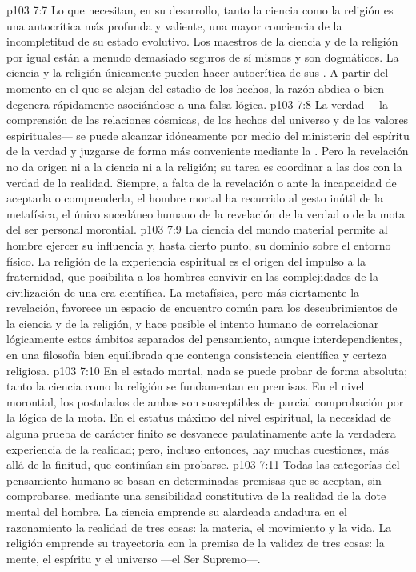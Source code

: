 \vs p103 7:7 Lo que necesitan, en su desarrollo, tanto la ciencia como la religión es una autocrítica más profunda y valiente, una mayor conciencia de la incompletitud de su estado evolutivo. Los maestros de la ciencia y de la religión por igual están a menudo demasiado seguros de sí mismos y son dogmáticos. La ciencia y la religión únicamente pueden hacer autocrítica de sus . A partir del momento en el que se alejan del estadio de los hechos, la razón abdica o bien degenera rápidamente asociándose a una falsa lógica.
\vs p103 7:8 \pc La verdad ---la comprensión de las relaciones cósmicas, de los hechos del universo y de los valores espirituales--- se puede alcanzar idóneamente por medio del ministerio del espíritu de la verdad y juzgarse de forma más conveniente mediante la . Pero la revelación no da origen ni a la ciencia ni a la religión; su tarea es coordinar a las dos con la verdad de la realidad. Siempre, a falta de la revelación o ante la incapacidad de aceptarla o comprenderla, el hombre mortal ha recurrido al gesto inútil de la metafísica, el único sucedáneo humano de la revelación de la verdad o de la mota del ser personal morontial.
\vs p103 7:9 La ciencia del mundo material permite al hombre ejercer su influencia y, hasta cierto punto, su dominio sobre el entorno físico. La religión de la experiencia espiritual es el origen del impulso a la fraternidad, que posibilita a los hombres convivir en las complejidades de la civilización de una era científica. La metafísica, pero más ciertamente la revelación, favorece un espacio de encuentro común para los descubrimientos de la ciencia y de la religión, y hace posible el intento humano de correlacionar lógicamente estos ámbitos separados del pensamiento, aunque interdependientes, en una filosofía bien equilibrada que contenga consistencia científica y certeza religiosa.
\vs p103 7:10 \pc En el estado mortal, nada se puede probar de forma absoluta; tanto la ciencia como la religión se fundamentan en premisas. En el nivel morontial, los postulados de ambas son susceptibles de parcial comprobación por la lógica de la mota. En el estatus máximo del nivel espiritual, la necesidad de alguna prueba de carácter finito se desvanece paulatinamente ante la verdadera experiencia de la realidad; pero, incluso entonces, hay muchas cuestiones, más allá de la finitud, que continúan sin probarse.
\vs p103 7:11 Todas las categorías del pensamiento humano se basan en determinadas premisas que se aceptan, sin comprobarse, mediante una sensibilidad constitutiva de la realidad de la dote mental del hombre. La ciencia emprende su alardeada andadura en el razonamiento  la realidad de tres cosas: la materia, el movimiento y la vida. La religión emprende su trayectoria con la premisa de la validez de tres cosas: la mente, el espíritu y el universo ---el Ser Supremo---.
